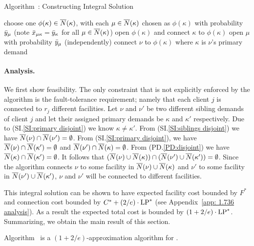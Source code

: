 \documentclass{llncs}
\begin{document}
\begin{algorithm}
  \caption{Algorithm~{\ECHS}:
    Constructing Integral Solution}
  \label{alg:lpr3}
  \begin{algorithmic}[1]
    \State choose one $\phi(\kappa)\in {\overline{N}}(\kappa)$,
    with each $\mu\in{\overline{N}}(\kappa)$ chosen as $\phi(\kappa)$
    with probability ${\bar y}_\mu$ (note {${\bar x}_{\mu\kappa} =
      {\bar y}_{\kappa}$ for all $\mu \in {\overline{N}}(\kappa)$})
    \State open $\phi(\kappa)$ and connect $\kappa$ to $\phi(\kappa)$
    \EndFor
    \State open $\mu$ with probability ${\bar y}_\mu$ (independently)
    \EndFor
    \Else
    \State connect $\nu$ to $\phi(\kappa)$ where $\kappa$ is $\nu$'s
     primary demand
    \EndIf
    \EndFor
  \end{algorithmic}
\end{algorithm}


\paragraph{Analysis.}
We first show feasibility.
The only constraint that is not explicitly
enforced by the algorithm is the fault-tolerance requirement; namely
that each client $j$ is connected to $r_j$ different facilities. Let
$\nu$ and $\nu'$ be two different sibling demands of client $j$ and
let their assigned primary demands be $\kappa$ and $\kappa'$
respectively. Due to (SI.\ref{SI:primary disjoint}) we know $\kappa
\neq \kappa'$. From (SI.\ref{SI:siblings disjoint}) we have
${\overline{N}}(\nu) \cap {\overline{N}}(\nu') = \emptyset$. From (SI.\ref{SI:primary
  disjoint}), we have ${\overline{N}}(\nu) \cap {\overline{N}}(\kappa') = \emptyset$
and ${\overline{N}}(\nu') \cap {\overline{N}}(\kappa) = \emptyset$. From
(PD.\ref{PD:disjoint}) we have ${\overline{N}}(\kappa)\cap {\overline{N}}(\kappa') =
\emptyset$. It follows that $({\overline{N}}(\nu) \cup {\overline{N}}(\kappa)) \cap
({\overline{N}}(\nu') \cup {\overline{N}}(\kappa')) = \emptyset$. Since the algorithm
connects $\nu$ to some facility in ${\overline{N}}(\nu) \cup {\overline{N}}(\kappa)$
and $\nu'$ to some facility in ${\overline{N}}(\nu') \cup {\overline{N}}(\kappa')$,
$\nu$ and $\nu'$ will be connected to different facilities. 

This integral solution can be shown to have expected facility cost
bounded by $F^\ast$ and connection cost bounded by $C^\ast +
(2/e)\cdot \mbox{\rm LP}^\ast$ (see Appendix~\ref{app: 1.736 analysis}). As a
result the expected total cost is bounded by $(1 + 2/e)\cdot
\mbox{\rm LP}^\ast$. Summarizing, we obtain the main result of this section.
\begin{theorem}\label{thm:1736}
  Algorithm~{\ECHS} is a $(1+2/e)$-approximation algorithm for \FTFP.
\end{theorem}
\end{document}
